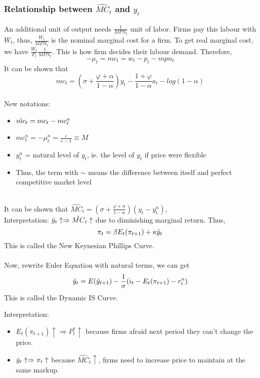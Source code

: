 \documentclass{article}
\begin{document}
\subsubsection{Relationship between $\hat{MC}_t$ and $y_t$}
An additional unit of output needs $\frac{1}{MPN_t}$ unit of labor. Firms pay this labour with $W_t$, thus, $\frac{W_t}{MPN_t}$ is the nominal marginal cost for a firm. To get real marginal cost, we have $\frac{W_t}{P_t} \frac{1}{MPN_t}$. This is how firm decides their labour demand. Therefore,  
$$-\mu_t = mc_t = w_t - p_t - mpn_t$$
It can be shown that
$$mc_t = \left(\sigma + \frac{\varphi + \alpha}{1 - \alpha}\right)y_t - \frac{1+\varphi}{1-\alpha}a_t - log(1-\alpha)$$
\\
New notations:
\begin{itemize}
    \item $\Tilde{mc}_t = mc_t - mc_t^n$
    \item $mc_t^n = -\mu_t^n = \frac{\varepsilon}{\varepsilon - 1} \equiv M$
    \item $y_t^n$ = natural level of $y_t$, ie. the level of $y_t$ if price were flexible
    \item Thus, the term with $\sim$ means the difference between itself and perfect competitive market level
\end{itemize}
\\
It can be shown that $\hat{MC}_t = \left(\sigma + \frac{\varphi + \alpha}{1 - \alpha}\right)(y_t - y_t^n)$, \\
{\color{ForestGreen} Interpretation: $\Tilde{y}_t \uparrow \Rightarrow \hat{MC}_t \uparrow$ due to diminishing marginal return.} Thus, 
$$\pi_t = \beta E_t(\pi_{t+1}) + \kappa \Tilde{y}_t$$
This is called the New Keynesian Phillips Curve.\\
\\
Now, rewrite Euler Equation with natural terms, we can get
$$\Tilde{y}_t = E(\Tilde{y}_{t+1}) - \frac{1}{\sigma}(i_t - E_t(\pi_{t+1}) - r_t^n)$$
This is called the Dynamic IS Curve. \\
{\color{ForestGreen}Interpretation:
\begin{itemize}
    \item $E_t(\pi_{t+1})\uparrow \Rightarrow P_t^* \uparrow$ because firms afraid next period they can't change the price.
    \item $\Tilde{y}_t \uparrow \Rightarrow \pi_t \uparrow$ because $\hat{MC}_t \uparrow$, firms need to increase price to maintain at the same markup.
\end{itemize}}
\end{document}
